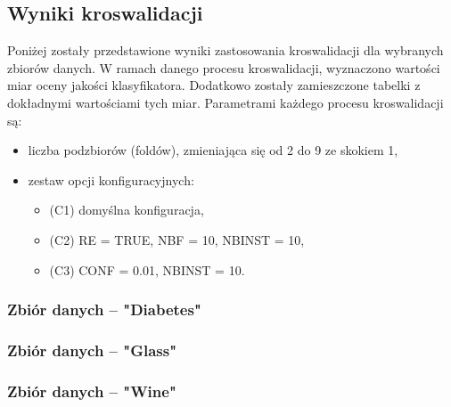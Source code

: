 \pagebreak
\subsection{Wyniki kroswalidacji}
    Poniżej zostały przedstawione wyniki zastosowania kroswalidacji dla wybranych 
    zbiorów danych. W ramach danego procesu kroswalidacji, wyznaczono wartości miar
    oceny jakości klasyfikatora. Dodatkowo zostały zamieszczone tabelki z dokładnymi
    wartościami tych miar. Parametrami każdego procesu kroswalidacji są:
    \begin{itemize}
        \item{liczba podzbiorów (foldów), zmieniająca się od 2 do 9 ze skokiem 1,}
        \item{zestaw opcji konfiguracyjnych:}
        \begin{itemize}
          \item{(C1) domyślna konfiguracja,}
          \item{(C2) RE = TRUE, NBF = 10, NBINST = 10,}
          \item{(C3) CONF = 0.01, NBINST = 10.}
        \end{itemize}
    \end{itemize}


    \subsubsection{Zbiór danych -- "Diabetes"}
        
        \pagebreak
        

    \pagebreak
    \subsubsection{Zbiór danych -- "Glass"}
        
        \pagebreak
        

    \pagebreak
    \subsubsection{Zbiór danych -- "Wine"}
        
        \pagebreak
        
